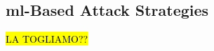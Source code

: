 \documentclass[draftcls,onecolumn,12pt]{IEEEtran}
\newcommand{\Exp}[1]{\mathbb{E}\left[#1\right]}
\begin{document}
{

\subsection{\ac{ml}-Based Attack Strategies}
\label{sec:attack}
\hl{LA TOGLIAMO??}

}
\end{document}
